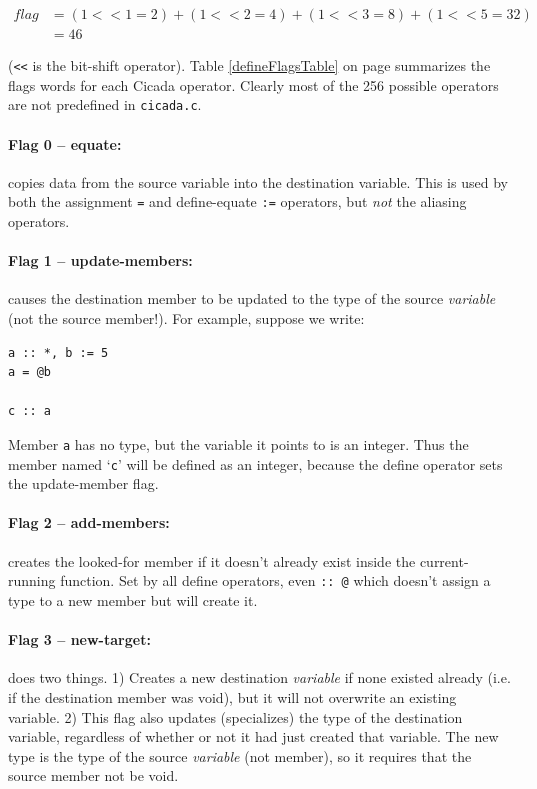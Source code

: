 \documentclass{article}
\newenvironment{code}{
       \begin{list}{}{
               \setlength{\leftmargin}{.4in}
               \setlength{\rightmargin}{0in}
               \setlength{\topsep}{.2in}
       }
       \small
       \item[] }
       { \end{list}   }
\begin{document}
\begin{align*}
flag &= (1 << 1 = 2) + (1 << 2 = 4) + (1 << 3 = 8) + (1 << 5 = 32)\\
&= 46
\end{align*}

\noindent (\verb#<<# is the bit-shift operator).  Table \ref{defineFlagsTable} on page \pageref{defineFlagsTable} summarizes the flags words for each Cicada operator.  Clearly most of the 256 possible operators are not predefined in \verb#cicada.c#.\\


\paragraph{Flag 0 -- equate:}  copies data from the source variable into the destination variable.  This is used by both the assignment \verb#=# and define-equate \verb#:=# operators, but \emph{not} the aliasing operators.\\


\paragraph{Flag 1 -- update-members:}  causes the destination member to be updated to the type of the source \emph{variable} (not the source member!).  For example, suppose we write:

\begin{code} \begin{verbatim}
a :: *, b := 5
a = @b

c :: a
\end{verbatim} \end{code}

\noindent Member \verb#a# has no type, but the variable it points to is an integer.  Thus the member named `\verb#c#' will be defined as an integer, because the define operator sets the update-member flag.\\


\paragraph{Flag 2 -- add-members:}  creates the looked-for member if it doesn't already exist inside the current-running function.  Set by all define operators, even \verb#:: @# which doesn't assign a type to a new member but will create it.\\


\paragraph{Flag 3 -- new-target:}  does two things.  1) Creates a new destination \emph{variable} if none existed already (i.e. if the destination member was void), but it will not overwrite an existing variable.  2) This flag also updates (specializes) the type of the destination variable, regardless of whether or not it had just created that variable.  The new type is the type of the source \emph{variable} (not member), so it requires that the source member not be void.
\end{document}
